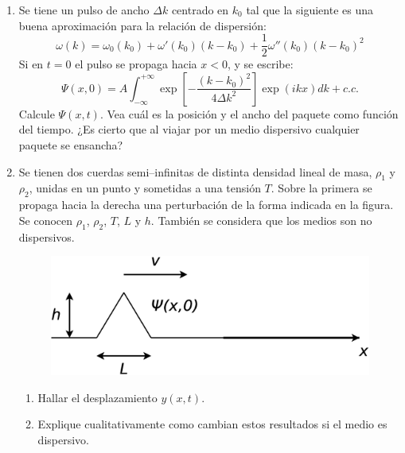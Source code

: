 \documentclass[11pt,spanish]{article}
\begin{document}
\begin{enumerate}

    \item Se tiene un pulso de ancho $\Delta k$ centrado en $k_{0}$ tal que
    la siguiente es una buena aproximación para la relación de dispersión:
    \[
    \omega(k)=\omega_{0}(k_{0})+\omega'(k_{0})(k-k_{0})+\frac{1}{2}\omega''(k_{0})(k-k_{0})^{2}
    \]
    Si en $t=0$ el pulso se propaga hacia $x<0$, y se escribe:
    \[
    \Psi(x,0)=A\int_{-\infty}^{+\infty}\exp\left[-\frac{(k-k_{0})^{2}}{4\Delta k^{2}}\right]\exp\left(ikx\right)dk+c.c.
    \]
    Calcule $\Psi(x,t)$. Vea cuál es la posición y el ancho del paquete
    como función del tiempo. ¿Es cierto que al viajar por un medio dispersivo
    cualquier paquete se ensancha?
    


	\item Se tienen dos cuerdas semi--infinitas de distinta densidad lineal
	de masa, $\rho_{1}$ y $\rho_{2}$, unidas en un punto y sometidas
	a una tensión $T$. Sobre la primera se propaga hacia la derecha una
	perturbación de la forma indicada en la figura. Se conocen $\rho_{1}$,
	$\rho_{2}$, $T$, $L$ y $h$. También se considera que los medios
	son no dispersivos.

	\begin{figure}[H]
		\centering{}\includegraphics[clip,scale=0.25]{figs/ej2-20}
	\end{figure}

	\begin{enumerate}
		\item Hallar el desplazamiento $y(x,t)$.
		\item Explique cualitativamente como cambian estos resultados si el medio
		es dispersivo. 
	\end{enumerate}
    
\end{enumerate}
\end{document}
